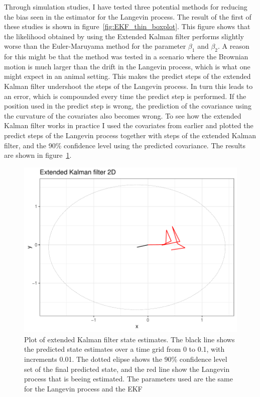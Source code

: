 



Through simulation studies, I have tested three potential methods for reducing the bias seen in the \parencite{michelot_langevin_2019} estimator for the Langevin process. The result of the first of these studies is shown in figure~\ref{fig:EKF_thin_boxplot}. This figure shows that the likelihood obtained by using the Extended Kalman filter performs slightly worse than the Euler-Maruyama method for the parameter $\beta_1$ and $\beta_2$. A reason for this might be that the method was tested in a scenario where the Brownian motion is much larger than the drift in the Langevin process, which is what one might expect in an animal setting. This makes the predict steps of the extended Kalman filter undershoot the steps of the Langevin process. In turn this leads to an error, which is compounded every time the predict step is performed. If the position used in the predict step is wrong, the prediction of the covariance using the curvature of the covariates also becomes wrong. To see how the extended Kalman filter works in practice I used the covariates from earlier and plotted the predict steps of the Langevin process together with steps of the extended Kalman filter, and the 90\% confidence level using the predicted covariance. The results are shown in figure~\ref{fig:EKF high diffusion}. 


\begin{figure}[H]
    \centering
    \includegraphics[width=\linewidth]{Images/discussion/EKF high diffusion path.pdf}
    \caption[Extended Kalman filter]{Plot of extended Kalman filter state estimates. The black line shows the predicted state estimates over a time grid from 0 to 0.1, with increments 0.01. The dotted elipse shows the 90\% confidence level set of the final predicted state, and the red line show the Langevin process that is beeing estimated. The parameters used are the same for the Langevin process and the EKF}
    \label{fig:EKF high diffusion}
\end{figure}

